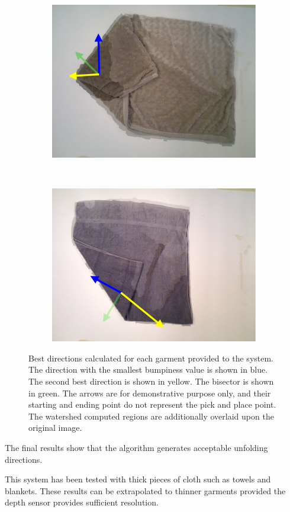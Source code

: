 \begin{figure}[htbp]
\begin{subfigure}[l]{0.49\textwidth}
    	\includegraphics[width=\textwidth]
    	{figures/directions-05.pdf}
    	\vspace{-10px}
	\end{subfigure}
	~
    \begin{subfigure}[r]{0.49\textwidth}
	    \centering
    	\includegraphics[width=\textwidth]
    	{figures/directions-06.pdf}
    	\vspace{-10px}
	\end{subfigure} 
    \caption{Best directions calculated for each garment provided to the system. The direction with the smallest bumpiness value is shown in blue. The second best direction is shown in yellow. The bisector is shown in green. The arrows are for demonstrative purpose only, and their starting and ending point do not represent the pick and place point. The watershed computed regions are additionally overlaid upon the original image.}
    \label{directions_several}
\end{figure}

The final results show that the algorithm generates acceptable unfolding directions.

This system has been tested with thick pieces of cloth such as towels and blankets. These results can be extrapolated to thinner garments provided the depth sensor provides sufficient resolution.
